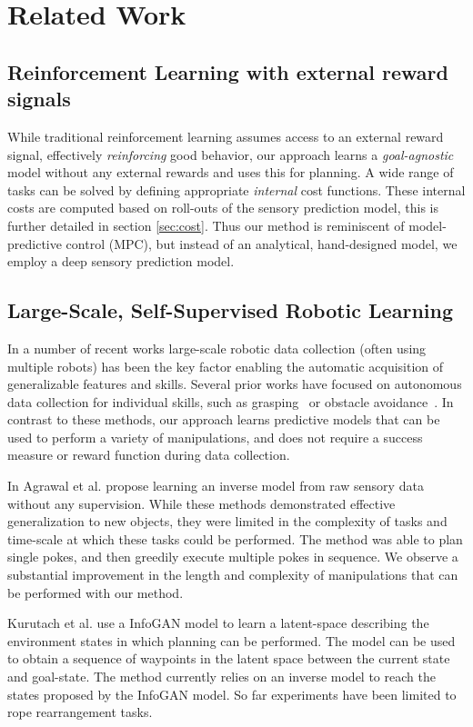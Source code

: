 \section{Related Work}\label{sec:rel_work}

\subsection{Reinforcement Learning with external reward signals}
While traditional reinforcement learning assumes access to an external reward signal, effectively \emph{reinforcing} good behavior, our approach learns a \emph{goal-agnostic} model without any external rewards and uses this for planning. 
A wide range of tasks can be solved by defining appropriate \emph{internal} cost functions. These internal costs are computed based on roll-outs of the sensory prediction model, this is further detailed in section \ref{sec:cost}. Thus our method is reminiscent of model-predictive control (MPC), but instead of an analytical, hand-designed model, we employ a deep sensory prediction model.

\subsection{Large-Scale, Self-Supervised Robotic Learning}

In a number of recent works large-scale robotic data collection (often using multiple robots) has been the key factor enabling the automatic acquisition of generalizable features and skills. Several prior works have focused on autonomous data collection for individual skills, such as grasping~\cite{lerrel,google_handeye} or obstacle avoidance~\cite{greg_kahn_uncertainty,crashing}. In contrast to these methods, our approach learns predictive models that can be used to perform a variety of manipulations, and does not require a success measure or reward function during data collection. 

In \cite{pulkit} Agrawal et al. propose learning an inverse model from raw sensory data without any supervision. While these methods demonstrated effective generalization to new objects, they were limited in the complexity of tasks and time-scale at which these tasks could be performed. The method was able to plan single pokes, and then greedily execute multiple pokes in sequence. We observe a substantial improvement in the length and complexity of manipulations that can be performed with our method.

Kurutach et al. use a InfoGAN model \cite{kurutach2018learning} to learn a latent-space describing the environment states in which planning can be performed. The model can be used to obtain a sequence of waypoints in the latent space between the current state and goal-state. The method currently relies on an inverse model to reach the states proposed by the InfoGAN model. So far experiments have been limited to rope rearrangement tasks.

